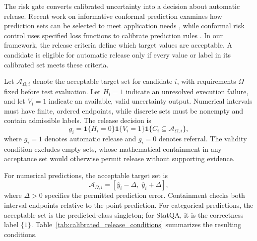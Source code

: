 \documentclass[preprint,12pt,authoryear]{elsarticle}
\begin{document}
The risk gate converts calibrated uncertainty into a decision about
automatic release. Recent work on informative conformal prediction examines how
prediction sets can be selected to meet application needs
\cite{gazin2025selecting}, while conformal risk control uses
specified loss functions to calibrate prediction rules
\cite{angelopoulos2024conformal}. In our framework, the
release criteria define which target values are acceptable.
A candidate is eligible for automatic release only if every
value or label in its calibrated set meets these criteria.

Let \(\mathcal{A}_{\Omega,i}\) denote the acceptable target set for
candidate \(i\), with requirements \(\Omega\) fixed before test
evaluation. Let \(H_i=1\) indicate an unresolved execution failure,
and let \(V_i=1\) indicate an available, valid uncertainty output.
Numerical intervals must have finite, ordered endpoints, while
discrete sets must be nonempty and contain admissible labels.
The release decision is
\begin{equation}
    g_i
    =
    \mathbf{1}\{H_i=0\}
    \mathbf{1}\{V_i=1\}
    \mathbf{1}\{C_i\subseteq\mathcal{A}_{\Omega,i}\},
    \label{eq:unified_release_gate}
\end{equation}
where \(g_i=1\) denotes automatic release and \(g_i=0\) denotes referral.
The validity condition excludes empty sets, whose mathematical
containment in any acceptance set would otherwise permit release
without supporting evidence.

For numerical predictions, the acceptable target set is
\begin{equation}
    \mathcal{A}_{\Omega,i}
    =
    \left[
        \widehat y_i-\Delta,\;
        \widehat y_i+\Delta
    \right],
    \label{eq:numerical_acceptance_set}
\end{equation}
where \(\Delta>0\) specifies the permitted prediction error.
Containment checks both interval endpoints relative to the point
prediction. For categorical
predictions, the acceptable set is the predicted-class singleton;
for StatQA, it is the correctness label \(\{1\}\).
Table~\ref{tab:calibrated_release_conditions} summarizes the
resulting conditions.
\end{document}
